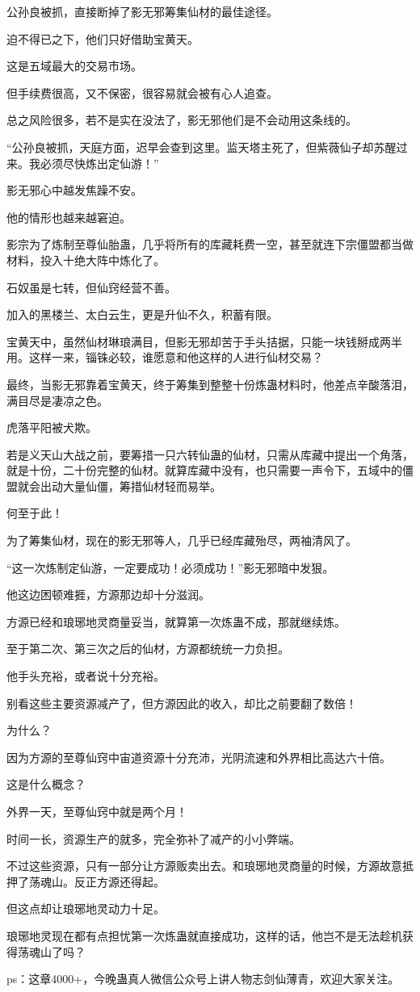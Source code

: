 \begin{this_body}
公孙良被抓，直接断掉了影无邪筹集仙材的最佳途径。

迫不得已之下，他们只好借助宝黄天。

这是五域最大的交易市场。

但手续费很高，又不保密，很容易就会被有心人追查。

总之风险很多，若不是实在没法了，影无邪他们是不会动用这条线的。

“公孙良被抓，天庭方面，迟早会查到这里。监天塔主死了，但紫薇仙子却苏醒过来。我必须尽快炼出定仙游！”

影无邪心中越发焦躁不安。

他的情形也越来越窘迫。

影宗为了炼制至尊仙胎蛊，几乎将所有的库藏耗费一空，甚至就连下宗僵盟都当做材料，投入十绝大阵中炼化了。

石奴虽是七转，但仙窍经营不善。

加入的黑楼兰、太白云生，更是升仙不久，积蓄有限。

宝黄天中，虽然仙材琳琅满目，但影无邪却苦于手头拮据，只能一块钱掰成两半用。这样一来，锱铢必较，谁愿意和他这样的人进行仙材交易？

最终，当影无邪靠着宝黄天，终于筹集到整整十份炼蛊材料时，他差点辛酸落泪，满目尽是凄凉之色。

虎落平阳被犬欺。

若是义天山大战之前，要筹措一只六转仙蛊的仙材，只需从库藏中提出一个角落，就是十份，二十份完整的仙材。就算库藏中没有，也只需要一声令下，五域中的僵盟就会出动大量仙僵，筹措仙材轻而易举。

何至于此！

为了筹集仙材，现在的影无邪等人，几乎已经库藏殆尽，两袖清风了。

“这一次炼制定仙游，一定要成功！必须成功！”影无邪暗中发狠。

他这边困顿难捱，方源那边却十分滋润。

方源已经和琅琊地灵商量妥当，就算第一次炼蛊不成，那就继续炼。

至于第二次、第三次之后的仙材，方源都统统一力负担。

他手头充裕，或者说十分充裕。

别看这些主要资源减产了，但方源因此的收入，却比之前要翻了数倍！

为什么？

因为方源的至尊仙窍中宙道资源十分充沛，光阴流速和外界相比高达六十倍。

这是什么概念？

外界一天，至尊仙窍中就是两个月！

时间一长，资源生产的就多，完全弥补了减产的小小弊端。

不过这些资源，只有一部分让方源贩卖出去。和琅琊地灵商量的时候，方源故意抵押了荡魂山。反正方源还得起。

但这点却让琅琊地灵动力十足。

琅琊地灵现在都有点担忧第一次炼蛊就直接成功，这样的话，他岂不是无法趁机获得荡魂山了吗？

ps：这章4000+，今晚蛊真人微信公众号上讲人物志剑仙薄青，欢迎大家关注。

\end{this_body}

